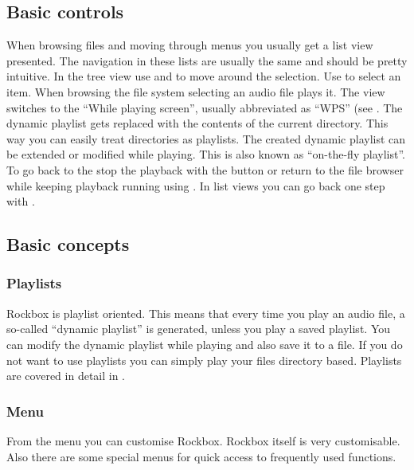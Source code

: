 \subsection{Basic controls}
When browsing files and moving through menus you usually get a list view
presented. The navigation in these lists are usually the same and should be
pretty intuitive.
In the tree view use \ActionStdNext{} and \ActionStdPrev{} to move around
the selection. Use \ActionStdOk{} to select an item. 
When browsing the file system selecting an audio file plays it. The view 
switches to the ``While playing screen'', usually abbreviated as ``WPS'' (see 
. The dynamic playlist gets replaced with the contents of 
the current directory. This way you can easily treat directories as playlists. 
The created dynamic playlist can be extended or modified while playing. This is 
also known as ``on-the-fly playlist''.
To go back to the  stop the playback with the
\ActionWpsStop{} button or return to the file browser while keeping playback
running using \ActionWpsBrowse{}.
In list views you can go back one step with \ActionTreeParentDirectory.

\subsection{Basic concepts}
\subsubsection{Playlists}
Rockbox is playlist oriented. This means that every time you play an audio file,
a so-called ``dynamic playlist'' is generated, unless you play a saved
playlist. You can modify the dynamic playlist while playing and also save
it to a file. If you do not want to use playlists you can simply play your
files directory based.
Playlists are covered in detail in .

\subsubsection{Menu}
From the menu you can customise Rockbox. Rockbox itself is very customisable.
Also there are some special menus for quick access to frequently used
functions.

